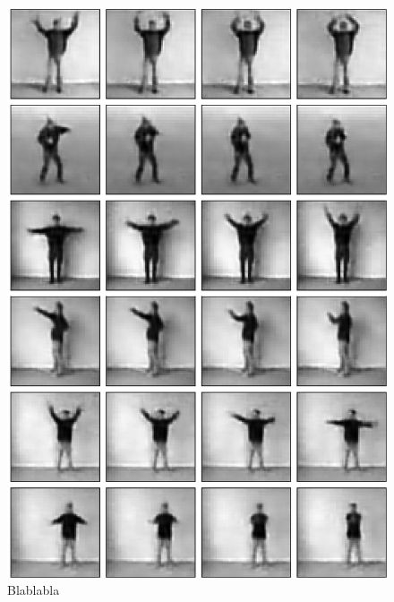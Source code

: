 \documentclass[12pt]{article}
\begin{document}
\begin{figure}
\begin{minipage}[position=r]{0.5\textwidth}
\begin{mdframed}[style=inner]
				\includegraphics[scale=0.47]{movies_extrapolation}
			\end{mdframed}
		\end{minipage}
		\caption{Blablabla}
	\end{figure}
	\newpage
\end{document}
